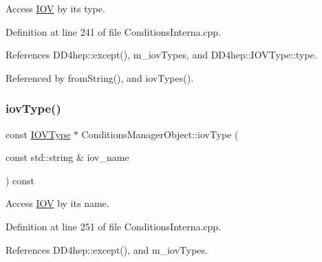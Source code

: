 Access \hyperlink{class_d_d4hep_1_1_i_o_v}{I\+OV} by its type. 



Definition at line 241 of file Conditions\+Interna.\+cpp.



References D\+D4hep\+::except(), m\+\_\+iov\+Types, and D\+D4hep\+::\+I\+O\+V\+Type\+::type.



Referenced by from\+String(), and iov\+Types().

\hypertarget{class_d_d4hep_1_1_conditions_1_1_conditions_manager_object_a52c243546411e3e5d23c366fb7633286}{}\label{class_d_d4hep_1_1_conditions_1_1_conditions_manager_object_a52c243546411e3e5d23c366fb7633286} 
\subsubsection{\texorpdfstring{iov\+Type()}{iovType()}\hspace{0.1cm}{\footnotesize\ttfamily [2/2]}}
{\footnotesize\ttfamily const \hyperlink{class_d_d4hep_1_1_i_o_v_type}{I\+O\+V\+Type} $\ast$ Conditions\+Manager\+Object\+::iov\+Type (\begin{DoxyParamCaption}\item[{const std\+::string \&}]{iov\+\_\+name }\end{DoxyParamCaption}) const}



Access \hyperlink{class_d_d4hep_1_1_i_o_v}{I\+OV} by its name. 



Definition at line 251 of file Conditions\+Interna.\+cpp.



References D\+D4hep\+::except(), and m\+\_\+iov\+Types.

\hypertarget{class_d_d4hep_1_1_conditions_1_1_conditions_manager_object_a15d8bc1bbe6bd7f5aeb2c83be9035bff}{}\label{class_d_d4hep_1_1_conditions_1_1_conditions_manager_object_a15d8bc1bbe6bd7f5aeb2c83be9035bff} 
